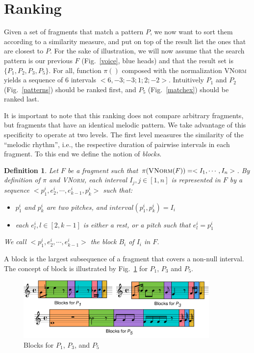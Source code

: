 \documentclass[letterpaper, 11pt]{article}
\newtheorem{Definition}{Definition}
\begin{document}
\section{Ranking}\label{sec:rank}

Given a set of fragments that match a pattern $P$, we now want to sort them
according to a similarity measure, and  put on top of the result list the ones that are closest to $P$.
For the sake of illustration, we will now assume that the search pattern is our previous 
$F$ (Fig.~\ref{voice}, blue heads) and that the result set is $\{P_1, P_2, P_3, P_5\}$.
For all, function $\pi()$ composed with the normalization \textsc{VNorm} yields a sequence
of 6 intervals $<6, -3; -3; 1; 2; -2>$. Intuitively $P_1$ and $P_2$ (Fig.~\ref{patterns})
should be ranked first, and $P_5$ (Fig.~\ref{matchex}) should be ranked last. 

It is important to note that this ranking does not compare arbitrary fragments, but fragments
that have an identical melodic pattern. We take advantage of this specificity to
operate at two levels. The first level measures the similarity of the 
``melodic rhythm'', i.e., the respective duration of pairwise intervals in each fragment.
To this end we define the notion of \emph{blocks}.

\begin{Definition}
Let $F$ be a fragment such that $\pi(\textsc{VNorm}(F)) = <I_1, \cdots, I_n>$. By definition of
$\pi$ and \textsc{VNorm}, each 
interval $I_j, j \in [1,n]$ is represented in $F$  by a sequence 
$<p^i_1, e^i_2, \cdots, e^i_{k-1}, p^i_k>$ such that: 
\begin{itemize}
   \item $p^i_1$ and $p^i_k$ are two pitches, and $interval(p^i_1, p^i_k) = I_i$
   \item each $e^i_l, l \in [2,k-1]$ is either a rest, or a pitch such that  $e^i_l = p^i_1$
\end{itemize}

We call $<p^i_1, e^i_2, \cdots, e^i_{k-1}>$ the \emph{block} $B_i$ of 
$I_i$ in $F$.
\end{Definition}

A block is the largest subsequence of a fragment that covers 
a non-null interval.  The concept of block is illustrated by Fig.~\ref{rhythm-blocks} 
for $P_1$, $P_3$ and $P_5$. 

\begin{figure}[ht]
 \centerline{
 \includegraphics[width=10cm]{../figures/rhythm-blocks}}
 \caption{\label{rhythm-blocks} Blocks for $P_1$, $P_3$, and $P_5$}
\end{figure}
\end{document}
